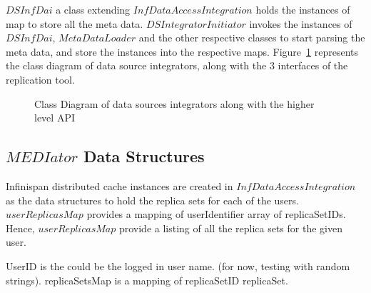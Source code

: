 \documentclass[conference]{IEEEtran}
\begin{document}
$DSInfDai$ a class extending $InfDataAccessIntegration$ holds the instances of map to store all the meta data. $DSIntegratorInitiator$ invokes the instances of $DSInfDai$, $MetaDataLoader$ and the other respective classes to start parsing the meta data, and store the instances into the respective maps. Figure~\ref{fig:dsclass} represents the class diagram of data source integrators, along with the 3 interfaces of the replication tool.

\begin{figure}[!htbp]
\begin{center}
\end{center}
 \caption{Class Diagram of data sources integrators along with the higher level API}
 \label{fig:dsclass}
\end{figure}

\subsection{$MEDIator$ Data Structures}
Infinispan distributed cache instances are created in $InfDataAccessIntegration$ as the data structures to hold the replica sets for each of the users. $userReplicasMap$ provides a mapping of userIdentifier  array of replicaSetIDs. Hence, $userReplicasMap$ provide a listing of all the replica sets for the given user.


UserID is the could be the logged in user name. (for now, testing with random strings).
replicaSetsMap is a mapping of replicaSetID  replicaSet.
\end{document}
